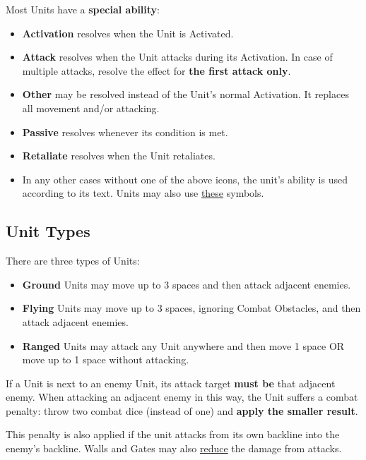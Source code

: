\begin{multicols}{2}
\vspace*{\fill}

Most Units have a \textbf{special ability}:\par
\begin{itemize}[wide]
  \item\textbf{Activation}  resolves when the Unit is Activated.
  \item\textbf{Attack}  resolves when the Unit attacks during its Activation.
    In case of multiple attacks, resolve the effect for \textbf{the first attack only}.
  \item\textbf{Other}  may be resolved instead of the Unit's normal Activation.
    It replaces all movement and/or attacking.
  \item\textbf{Passive}  resolves whenever its condition is met.
  \item\textbf{Retaliate}  resolves when the Unit retaliates.
  \item In any other cases without one of the above icons, the unit's ability is used according to its text.
    Units may also use \hyperlink{Playerdecks}{these} symbols.
\end{itemize}

\vspace*{\fill}

\columnbreak

\subsection*{\hypertarget{Unittype}{Unit Types}}
There are three types of Units:
\begin{itemize}
  \item \textbf{Ground}  Units may move up to 3 spaces and then attack adjacent enemies.
  \item \textbf{Flying}  Units may move up to 3 spaces, ignoring Combat Obstacles, and then attack adjacent enemies.
  \item \textbf{Ranged}  Units may attack any Unit anywhere and then move 1 space OR move up to 1 space without attacking.
\end{itemize}
If a  Unit is next to an enemy Unit, its attack target \textbf{must be} that adjacent enemy.
When attacking an adjacent enemy in this way, the  Unit suffers a combat penalty: throw two combat dice (instead of one) and \textbf{apply the smaller result}.\par
This penalty is also applied if the  unit attacks from its own backline into the enemy's backline.
Walls and Gates may also \hyperlink{Walls}{reduce} the damage from   attacks.


\end{multicols}
